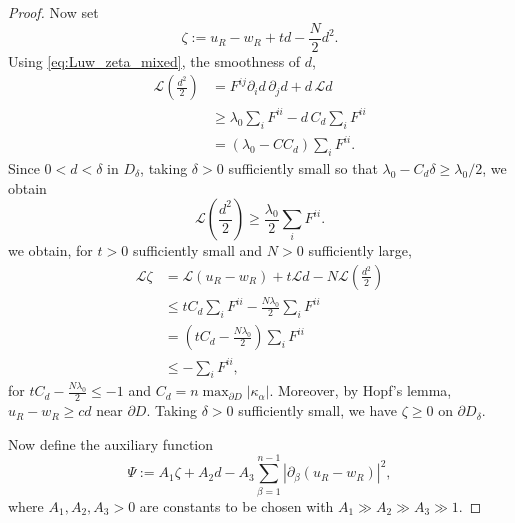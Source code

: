 \documentclass[10pt,a4paper]{amsart}
\begin{document}
\begin{proof}
		Now set
		\[
		\zeta:=u_R-w_R+td-\frac{N}{2}d^2.
		\]
		Using \eqref{eq:Luw_zeta_mixed}, the smoothness of $d$, 
		$$
		\begin{aligned}
			\mathcal L\left(\frac{d^2}{2}\right)
			&= F^{ij}\partial_i d\,\partial_j d + d\,\mathcal L d \\
			&\ge \lambda_0\sum_i F^{ii} - d\,C_d\sum_i F^{ii} \\
			&= (\lambda_0 - C C_d)\sum_i F^{ii}.
		\end{aligned}$$
		Since $0<d<\delta$ in $D_\delta$, taking $\delta>0$ sufficiently small so that $\lambda_0 - C_d\delta \ge \lambda_0/2$, we obtain
		\begin{equation}
			\mathcal L\left(\frac{d^2}{2}\right) \ge \frac{\lambda_0}{2}\sum_i F^{ii}.
		\end{equation}
		we obtain, for $t>0$ sufficiently small and $N>0$ sufficiently large,
		\begin{equation}
			\begin{aligned}
				\mathcal{L}\zeta
				&= \mathcal{L}(u_R-w_R) + t\mathcal{L}d - N\mathcal{L}\left(\frac{d^2}{2}\right) \\
				&\le tC_d\sum_i F^{ii} - \frac{N\lambda_0}{2}\sum_i F^{ii} \\
				&= \left(tC_d-\frac{N\lambda_0}{2}\right)\sum_i F^{ii} \\
				&\le  -\sum_iF^{ii},
			\end{aligned}
			\label{eq:Lzeta_mixed}
		\end{equation}
		for $tC_d-\frac{N\lambda_0}{2}\leq -1$ and $C_d = n\max_{\partial D}|\kappa_\alpha|$. 
		Moreover, by Hopf's lemma, $u_R-w_R\ge cd$ near $\partial D$. Taking $\delta>0$ sufficiently small, we have $\zeta\ge0$ on $\partial D_\delta$.
		
		Now define the auxiliary function
		\[
		\Psi := A_1\zeta + A_2 d - A_3\sum_{\beta=1}^{n-1}|\partial_\beta(u_R-w_R)|^2,
		\]
		where $A_1,A_2,A_3>0$ are constants to be chosen with $A_1\gg A_2\gg A_3\gg 1$.
		

\end{proof}
\end{document}

